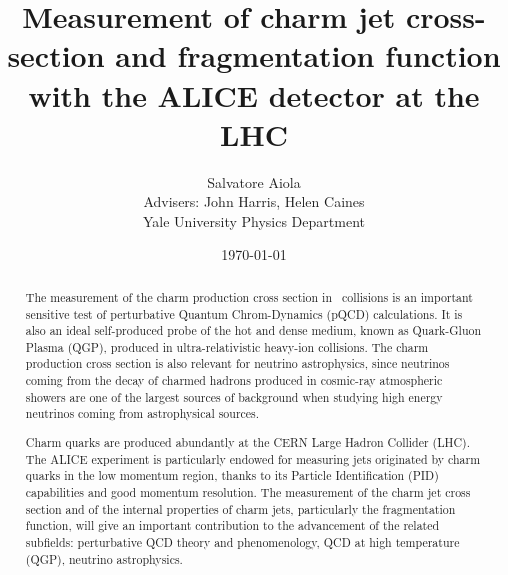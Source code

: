 \documentclass[12pt, a4paper, twoside, titlepage]{article}
\title{Measurement of charm jet cross-section and fragmentation function
with the ALICE detector at the LHC}
\author{Salvatore Aiola  \\
	Advisers: John Harris, Helen Caines \\
	Yale University Physics Department
	}
\date{\today}
\begin{document}
\maketitle

\begin{abstract}
The measurement of the charm production cross section in \pp\ collisions is an important sensitive test of perturbative Quantum Chrom-Dynamics (pQCD) calculations.
It is also an ideal self-produced probe of the hot and dense medium, known as Quark-Gluon Plasma (QGP), produced in ultra-relativistic heavy-ion collisions.
The charm production cross section is also relevant for neutrino astrophysics, since neutrinos coming from the decay of charmed hadrons produced
in cosmic-ray atmospheric showers are one of the largest sources of background when studying high energy neutrinos coming from astrophysical sources.

Charm quarks are produced abundantly at the CERN Large Hadron Collider (LHC). The ALICE experiment is particularly endowed for measuring
jets originated by charm quarks in the low momentum region, thanks to its Particle Identification (PID) capabilities and good momentum resolution.
The measurement of the charm jet cross section and of the internal properties of charm jets, particularly the fragmentation function, will give an important
contribution to the advancement of the related subfields: perturbative QCD theory and phenomenology, QCD at high temperature (QGP), neutrino astrophysics.
\end{abstract}

\tableofcontents %
\newpage
\end{document}
